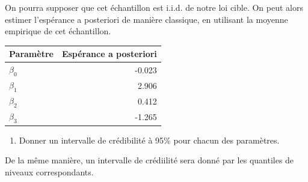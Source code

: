 \documentclass[]{article}
\newenvironment{Shaded}{\begin{snugshade}}{\end{snugshade}}
\newcommand{\CommentTok}[1]{\textcolor[rgb]{0.56,0.35,0.01}{\textit{#1}}}
\newcommand{\DataTypeTok}[1]{\textcolor[rgb]{0.13,0.29,0.53}{#1}}
\newcommand{\DecValTok}[1]{\textcolor[rgb]{0.00,0.00,0.81}{#1}}
\newcommand{\FloatTok}[1]{\textcolor[rgb]{0.00,0.00,0.81}{#1}}
\newcommand{\KeywordTok}[1]{\textcolor[rgb]{0.13,0.29,0.53}{\textbf{#1}}}
\newcommand{\NormalTok}[1]{#1}
\newcommand{\OperatorTok}[1]{\textcolor[rgb]{0.81,0.36,0.00}{\textbf{#1}}}
\newcommand{\StringTok}[1]{\textcolor[rgb]{0.31,0.60,0.02}{#1}}
\providecommand{\tightlist}{%
  \setlength{\itemsep}{0pt}\setlength{\parskip}{0pt}}
\newenvironment{Correction}%
  { \vspace{\baselineskip}\begin{mdframed}[backgroundcolor=my_green]}%
  {\end{mdframed}}
\begin{document}
\begin{Shaded}
\end{Shaded}

\begin{Correction}
On pourra supposer que cet échantillon est i.i.d. de notre loi cible. On peut alors estimer l'espérance a posteriori de manière classique, en utilisant la moyenne empirique de cet échantillon.
\end{Correction}

\begin{longtable}[]{@{}lr@{}}
\toprule
Paramètre & Espérance a posteriori\tabularnewline
\midrule
\endhead
\(\beta_0\) & -0.023\tabularnewline
\(\beta_1\) & 2.906\tabularnewline
\(\beta_2\) & 0.412\tabularnewline
\(\beta_3\) & -1.265\tabularnewline
\bottomrule
\end{longtable}

\begin{enumerate}
\def\labelenumi{\arabic{enumi}.}
\setcounter{enumi}{5}
\tightlist
\item
  Donner un intervalle de crédibilité à 95\% pour chacun des paramètres.
\end{enumerate}

\begin{Correction}
De la même manière, un intervalle de crédiilité sera donné par les quantiles de niveaux correspondants.
\end{Correction}
\end{document}
